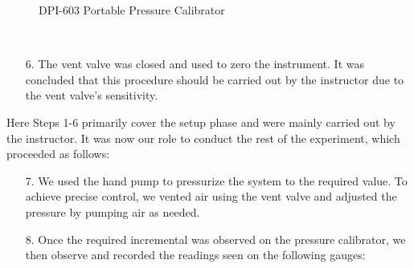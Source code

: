 \documentclass{article}
\begin{document}
\begin{minipage}{0.45\textwidth}
\begin{figure}[H]
		\caption{DPI-603 Portable Pressure Calibrator} 
		\label{fig:DPI-603} 
	\end{figure}
\end{minipage}\\[0pt]\noindent
\begin{enumerate}[left=0in]
\item[6.] The vent valve was closed and used to zero the instrument. It was concluded that this procedure should be carried out by the instructor due to the vent valve’s sensitivity.  
\end{enumerate}\vspace{0.6em}\noindent
Here Steps 1-6 primarily cover the setup phase and were mainly carried out by the instructor. It was now our role to conduct the rest of the experiment, which proceeded as follows:\\[-3pt]
\begin{enumerate}[left=0in]
\item[7.] We used the hand pump to pressurize the system to the required value. To achieve precise control, we vented air using the vent valve and adjusted the pressure by pumping air as needed.
\item[8.] Once the required incremental was observed on the pressure calibrator, we then observe and recorded the readings seen on the following gauges:\\[8pt]
\end{enumerate}
\end{document}
